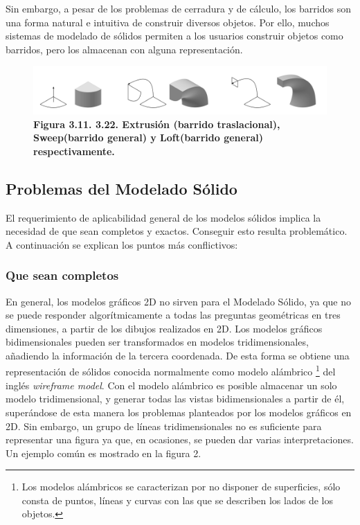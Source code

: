 Sin embargo, a pesar de los problemas de cerradura y de cálculo, los barridos son una
forma natural e intuitiva de construir diversos objetos. Por ello, muchos sistemas de modelado de sólidos permiten a los usuarios construir objetos como barridos, pero los almacenan con alguna representación.

\begin{figure}[h]
\includegraphics[width=16cm]{Img/GEO/geo-extrude1.jpg}
\centering
\caption{\textbf{Figura 3.11. \footnotesize{3.22.  Extrusión (barrido traslacional), Sweep(barrido general) y Loft(barrido general) respectivamente. }}}
\end{figure}

\subsection{ Problemas del Modelado Sólido }

El requerimiento de aplicabilidad general de los modelos sólidos implica la necesidad de que sean completos y exactos. Conseguir esto resulta problemático.
A continuación se explican los puntos más conflictivos: 

\subsubsection{Que sean completos}

En general, los modelos gráficos 2D no sirven para el Modelado Sólido, ya que no se puede responder algorítmicamente a todas las preguntas geométricas en tres dimensiones, a partir de los dibujos realizados en 2D.
Los modelos gráficos bidimensionales pueden ser transformados en modelos tridimensionales, añadiendo la información de la tercera coordenada.
De esta forma se obtiene una representación de sólidos conocida normalmente como modelo alámbrico \footnote{Los modelos alámbricos se caracterizan por no disponer de superficies, sólo consta de puntos, líneas y curvas con las que se describen los lados de los objetos.} del inglés \textit{wireframe model}. Con el modelo alámbrico es posible almacenar un solo modelo tridimensional, y generar todas las vistas bidimensionales a partir de él, superándose de esta manera los problemas planteados por los modelos gráficos en 2D.
Sin embargo, un grupo de líneas tridimensionales no es suficiente para representar una figura ya que, en ocasiones, se pueden dar varias interpretaciones.
Un ejemplo común es mostrado en la figura 2.

